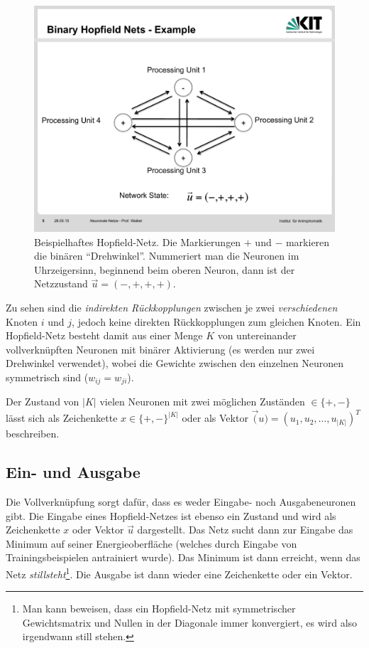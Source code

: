 \begin{figure}[ht!] \centering 
	\includegraphics[width=\linewidth]{figures/ch09_hopfield.pdf}
	\caption{Beispielhaftes Hopfield-Netz. Die Markierungen $+$ und $-$ markieren die binären "`Drehwinkel"'. Nummeriert man die Neuronen im Uhrzeigersinn, beginnend beim oberen Neuron, dann ist der Netzzustand $\vec{u} = (-,+,+,+)$.}
	\label{fig:ch09_hopfield}
\end{figure}

Zu sehen sind die \emph{indirekten Rückkopplungen} zwischen je zwei \emph{verschiedenen} Knoten $i$ und $j$, jedoch keine direkten Rückkopplungen zum gleichen Knoten. Ein Hopfield-Netz besteht damit aus einer Menge $K$ von untereinander vollverknüpften Neuronen mit binärer Aktivierung (es werden nur zwei Drehwinkel verwendet), wobei die Gewichte zwischen den einzelnen Neuronen symmetrisch sind ($w_{ij} = w_{ji}$).

Der Zustand von $|K|$ vielen Neuronen mit zwei möglichen Zuständen $\in \{+,-\}$ lässt sich als Zeichenkette $x \in \{+,-\}^|K|$ oder als Vektor $\vec(u) = (u_1, u_2, \ldots, u_{|K|})^T$ beschreiben.


\subsection*{Ein- und Ausgabe}
Die Vollverknüpfung sorgt dafür, dass es weder Eingabe- noch Ausgabeneuronen gibt. Die Eingabe eines Hopfield-Netzes ist ebenso ein Zustand und wird als Zeichenkette $x$ oder Vektor $\vec{u}$ dargestellt.
Das Netz sucht dann zur Eingabe das Minimum auf seiner Energieoberfläche (welches durch Eingabe von Trainingsbeispielen antrainiert wurde).
Das Minimum ist dann erreicht, wenn das Netz \emph{stillsteht}\footnote{Man kann beweisen, dass ein Hopfield-Netz mit symmetrischer Gewichtsmatrix und Nullen in der Diagonale immer konvergiert, es wird also irgendwann still stehen.}.
Die Ausgabe ist dann wieder eine Zeichenkette oder ein Vektor.


